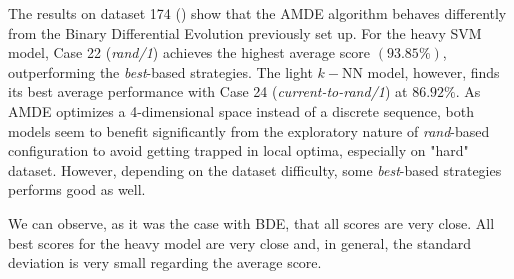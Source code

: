 \documentclass[12pt, openany]{article}
\begin{document}
The results on dataset 174 () show that the AMDE algorithm behaves differently from the Binary Differential Evolution previously set up. For the heavy SVM model, Case 22 (\textit{rand/1}) achieves the highest average score $(93.85\%)$, outperforming the \textit{best}-based strategies. The light $k-$NN model, however, finds its best average performance with Case 24 (\textit{current-to-rand/1}) at $86.92\%$. As AMDE optimizes a 4-dimensional space instead of a discrete sequence, both models seem to benefit significantly from the exploratory nature of \textit{rand}-based configuration to avoid getting trapped in local optima, especially on "hard" dataset. However, depending on the dataset difficulty, some \textit{best}-based strategies performs good as well.

We can observe, as it was the case with BDE, that all scores are very close. All best scores for the heavy model are very close and, in general, the standard deviation is very small regarding the average score.
\end{document}
